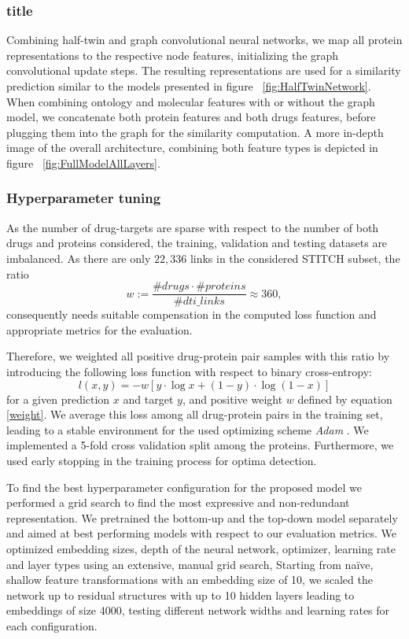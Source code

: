 \documentclass{bioinfo}
\begin{document}
\subsubsection{title}
Combining half-twin and graph convolutional neural networks, we map all protein representations to the respective node features, initializing the graph convolutional update steps. The resulting representations are used for a similarity prediction similar to the models presented in figure ~\ref{fig:HalfTwinNetwork}.  
When combining ontology and molecular features with or without the
graph model, we concatenate both protein features and both drugs
features, before plugging them into the graph for the similarity
computation. A more in-depth image of the overall architecture, combining both feature types is depicted in figure ~\ref{fig:FullModelAllLayers}. 

\subsubsection{Hyperparameter tuning}
As the number of drug-targets are sparse with respect to the number of
both drugs and proteins considered, the training, validation and
testing datasets are imbalanced. As there are only $22,336$ links in
the considered STITCH subset, the ratio
\begin{equation}
	w:= \frac{\#drugs \cdot \#proteins}{\#dti\_links} \approx 360,
	\label{weight}
\end{equation}
consequently needs suitable compensation in the computed loss function and
appropriate metrics for the evaluation.

Therefore, we weighted all positive drug-protein pair samples with
this ratio by introducing the following loss function with respect to
binary cross-entropy:
\begin{equation}
	l(x,y) = - w \left[ y \cdot \log x + (1 - y) \cdot \log (1 - x) \right]
\end{equation}
for a given prediction $x$ and target $y$, and positive weight $w$ defined by equation \eqref{weight}. We average this loss among
all drug-protein pairs in the training set, leading to a stable
environment for the used optimizing scheme \textit{Adam}
\citep{Adam2014}. We implemented a 5-fold cross validation split among the
proteins. Furthermore, we used early stopping in
the training process for optima detection.

To find the best hyperparameter configuration for the proposed model
we performed a grid search to find the most expressive and
non-redundant representation. We pretrained the bottom-up and the
top-down model separately and aimed at best performing models
with respect to our evaluation metrics. We optimized embedding sizes,
depth of the neural network, optimizer, learning rate and layer types
using an extensive, manual grid search, Starting from na\"ive, shallow feature transformations with an embedding size of 10, we scaled the network up to residual structures with up to 10 hidden layers leading to embeddings of size 4000, testing different network widths and learning rates for each configuration. 
\end{document}
